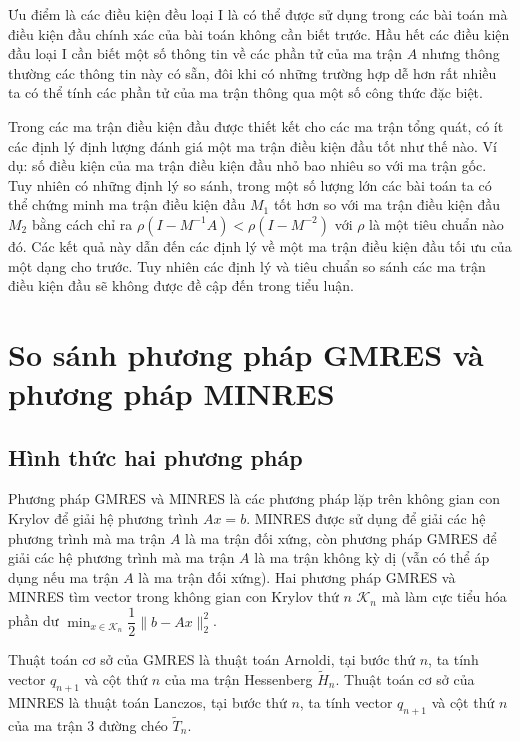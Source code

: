 \documentclass[14pt, a4paper]{article}
\numberwithin{equation}{section}
\numberwithin{algorithm}{section}
\numberwithin{figure}{section}
\numberwithin{dl}{section}
\numberwithin{md}{section}
\numberwithin{bd}{section}
\numberwithin{dn}{section}
\begin{document}
Ưu điểm là các điều kiện đều loại I là có thể được sử dụng trong các bài toán mà điều kiện đầu chính xác của bài toán không cần biết trước. Hầu hết các điều kiện đầu loại I cần biết một số thông tin về các phần tử của ma trận $A$ nhưng thông thường các thông tin này có sẵn, đôi khi có những trường hợp dễ hơn rất nhiều ta có thể tính các phần tử của ma trận thông qua một số công thức đặc biệt.

Trong các ma trận điều kiện đầu được thiết kết cho các ma trận tổng quát, có ít các định lý định lượng đánh giá một ma trận điều kiện đầu tốt như thế nào. Ví dụ: số điều kiện của ma trận điều kiện đầu nhỏ bao nhiêu so với ma trận gốc. Tuy nhiên có những định lý so sánh, trong một số lượng lớn các bài toán ta có thể chứng minh ma trận điều kiện đầu $M_1$ tốt hơn so với ma trận điều kiện đầu $M_2$ bằng cách chỉ ra $\rho(I - M^{-1}A) < \rho (I - M^{-2})$ với $\rho$ là một tiêu chuẩn nào đó.
Các kết quả này dẫn đến các định lý về một ma trận điều kiện đầu tối ưu của một dạng cho trước. Tuy nhiên các định lý và tiêu chuẩn so sánh các ma trận điều kiện đầu sẽ không được đề cập đến trong tiểu luận.

\section{So sánh phương pháp GMRES và phương pháp MINRES}

\subsection{Hình thức hai phương pháp}

Phương pháp GMRES và MINRES là các phương pháp lặp trên không gian con Krylov để giải hệ phương trình $Ax=b$.
MINRES được sử dụng để giải các hệ phương trình mà ma trận $A$ là ma trận đối xứng, còn phương pháp GMRES để giải các hệ phương trình mà ma trận $A$ là ma trận không kỳ dị (vẫn có thể áp dụng nếu ma trận $A$ là ma trận đối xứng).
Hai phương pháp GMRES và MINRES tìm vector trong không gian con Krylov thứ $n$ $\displaystyle \mathcal{K}_n$ mà làm cực tiểu hóa phần dư $\displaystyle \min_{x \in \mathcal{K}_n}\dfrac{1}{2}\lVert b - Ax \rVert_2^2$.

Thuật toán cơ sở của GMRES là thuật toán Arnoldi, tại bước thứ $n$, ta tính vector $q_{n+1}$ và cột thứ $n$ của ma trận Hessenberg $\widetilde{H}_n$. Thuật toán cơ sở của MINRES là thuật toán Lanczos, tại bước thứ $n$, ta tính vector $q_{n+1}$ và cột thứ $n$ của ma trận 3 đường chéo $\widetilde{T}_n$.
\end{document}

